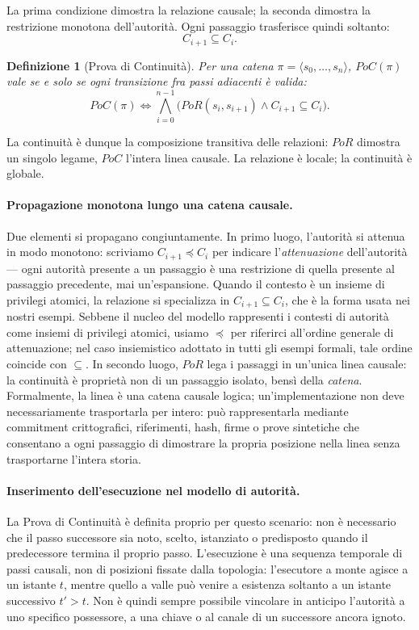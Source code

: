 \documentclass[11pt]{article}
\newtheorem{definition}{Definizione}
\begin{document}
La prima condizione dimostra la relazione causale; la seconda dimostra la
restrizione monotona dell'autorità. Ogni passaggio trasferisce quindi soltanto:
\[
C_{i+1} \subseteq C_i. \tag{C1}
\]

\begin{definition}[Prova di Continuità]
Per una catena $\pi = \langle s_0, \dots, s_n \rangle$, $PoC(\pi)$ vale se e
solo se ogni transizione fra passi adiacenti è valida:
\[
PoC(\pi) \Longleftrightarrow
\bigwedge_{i=0}^{n-1} \big( PoR(s_i, s_{i+1}) \land C_{i+1} \subseteq C_i \big).
\]
\end{definition}

La continuità è dunque la composizione transitiva delle relazioni: $PoR$
dimostra un singolo legame, $PoC$ l'intera linea causale. La relazione è locale;
la continuità è globale.

\paragraph{Propagazione monotona lungo una catena causale.}
Due elementi si propagano congiuntamente. In primo luogo, l'autorità si attenua
in modo monotono: scriviamo $C_{i+1} \preceq C_i$ per indicare
l'\emph{attenuazione} dell'autorità --- ogni autorità presente a un passaggio è
una restrizione di quella presente al passaggio precedente, mai un'espansione.
Quando il contesto è un insieme di privilegi atomici, la relazione si
specializza in $C_{i+1} \subseteq C_i$, che è la forma usata nei nostri esempi.
Sebbene il nucleo del modello rappresenti i contesti di autorità come insiemi
di privilegi atomici, usiamo $\preceq$ per riferirci all'ordine generale di
attenuazione; nel caso insiemistico adottato in tutti gli esempi formali, tale
ordine coincide con $\subseteq$. In secondo luogo, $PoR$ lega i passaggi in
un'unica linea causale: la continuità è proprietà non di un passaggio isolato,
bensì della \emph{catena}. Formalmente, la linea è una catena causale logica;
un'implementazione non deve necessariamente trasportarla per intero: può
rappresentarla mediante commitment crittografici, riferimenti, hash, firme o
prove sintetiche che consentano a ogni passaggio di dimostrare la propria
posizione nella linea senza trasportarne l'intera storia.

\paragraph{Inserimento dell'esecuzione nel modello di autorità.}
La Prova di Continuità è definita proprio per questo scenario: non è necessario
che il passo successore sia noto, scelto, istanziato o predisposto quando il
predecessore termina il proprio passo. L'esecuzione è una sequenza temporale di
passi causali, non di posizioni fissate dalla topologia: l'esecutore a monte
agisce a un istante $t$, mentre quello a valle può venire a esistenza soltanto a
un istante successivo $t' > t$. Non è quindi sempre possibile vincolare in
anticipo l'autorità a uno specifico possessore, a una chiave o al canale di un
successore ancora ignoto.
\end{document}
